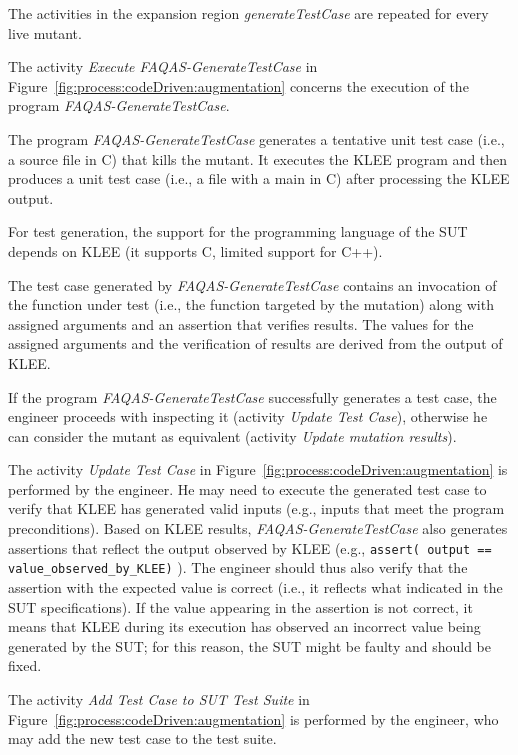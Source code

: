 \RQ{} The activities in the expansion region \emph{generateTestCase} are repeated for every live mutant.

\RQ{} The activity \emph{Execute FAQAS-GenerateTestCase} in Figure~\ref{fig:process:codeDriven:augmentation} concerns the execution of the program \emph{FAQAS-GenerateTestCase}.

\RQ{} The program \emph{FAQAS-GenerateTestCase} generates a tentative unit test case (i.e., a source file in C) that kills the mutant. It executes the KLEE program and then produces a unit test case (i.e., a file with a main in C) after processing the KLEE output.

\RQ{} For test generation, the support for the programming language of the SUT depends on KLEE (it supports C, limited support for C++).

\RQ{} The test case generated by \emph{FAQAS-GenerateTestCase} contains an invocation of the function under test (i.e., the function targeted  by the mutation) along with assigned arguments and an assertion that verifies results. The values for the assigned arguments and the verification of results are derived from the output of KLEE.

\RQ{} If the program \emph{FAQAS-GenerateTestCase} successfully generates a test case, the engineer proceeds with inspecting it (activity \emph{Update Test  Case}), otherwise he can consider the mutant as equivalent (activity \emph{Update mutation results}).

\RQ{} The activity \emph{Update Test  Case} in Figure~\ref{fig:process:codeDriven:augmentation} is performed by the engineer. He may need to execute the generated test case to verify that KLEE has generated valid inputs (e.g., inputs that meet the program preconditions). Based on KLEE results, \emph{FAQAS-GenerateTestCase} also generates assertions that reflect the output observed by KLEE (e.g., \texttt{assert( output == value\_observed\_by\_KLEE)} ). The engineer should thus also verify that the assertion with the expected value is correct (i.e., it reflects what indicated in the SUT specifications). If the value appearing in the assertion is not correct, it means that KLEE during its execution has observed an incorrect value being generated by the SUT; for this reason, the SUT might be faulty and should be fixed.

\RQ{} The activity \emph{Add Test Case to SUT Test Suite} in Figure~\ref{fig:process:codeDriven:augmentation} is performed by the engineer, who may add the new test case to the test suite.

